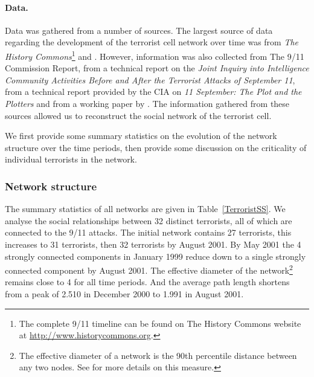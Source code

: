 \paragraph{Data.}

Data was gathered from a number of sources. The largest source of data regarding the development of the terrorist cell network over time was from \emph{The History Commons}\footnote{The complete 9/11 timeline can be found on The History Commons website at \href{http://www.historycommons.org}{http://www.historycommons.org}.} and \citet{Thompson2004}. However, information was also collected from The 9/11 Commission Report, from a technical report on the \emph{Joint Inquiry into Intelligence Community Activities Before and After the Terrorist Attacks of September 11}, from a technical report provided by the CIA on \emph{11 September: The Plot and the Plotters} and from a working paper by \citet{MassonWilkins2013}. The information gathered from these sources allowed us to reconstruct the social network of the terrorist cell.

We first provide some summary statistics on the evolution of the network structure over the time periods, then provide some discussion on the criticality of individual terrorists in the network.

\subsubsection*{Network structure}

The summary statistics of all networks are given in Table~\ref{TerroristSS}. We analyse the social relationships between 32 distinct terrorists, all of which are connected to the 9/11 attacks. The initial network contains 27 terrorists, this increases to 31 terrorists, then 32 terrorists by August 2001. By May 2001 the 4 strongly connected components in January 1999 reduce down to a single strongly connected component by August 2001. The effective diameter of the network\footnote{The effective diameter of a network is the 90th percentile distance between any two nodes. See \citet{Leskovec2005a} for more details on this measure.} remains close to 4 for all time periods. And the average path length shortens from a peak of 2.510 in December 2000 to 1.991 in August 2001.

